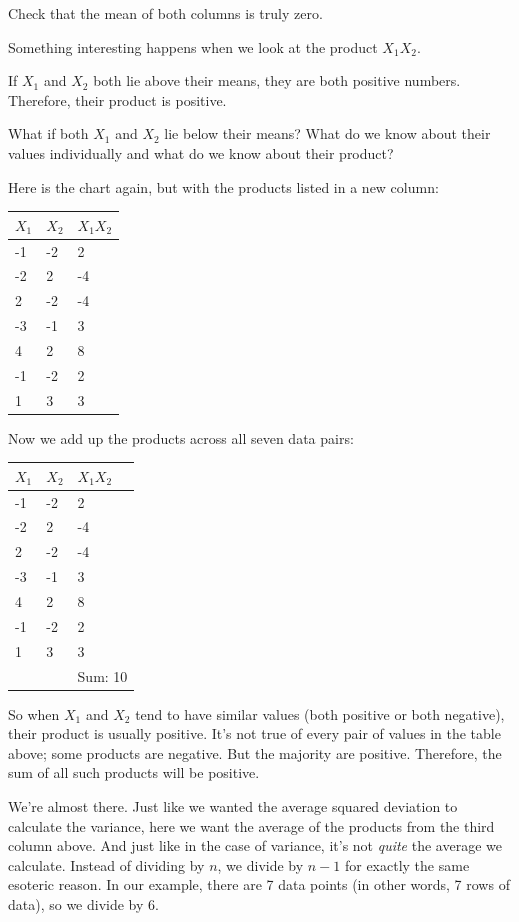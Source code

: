 \documentclass[
]{book}
\begin{document}
Check that the mean of both columns is truly zero.

Something interesting happens when we look at the product \(X_{1}X_{2}\).

If \(X_{1}\) and \(X_{2}\) both lie above their means, they are both positive numbers. Therefore, their product is positive.

What if both \(X_{1}\) and \(X_{2}\) lie below their means? What do we know about their values individually and what do we know about their product?

Here is the chart again, but with the products listed in a new column:

\begin{longtable}[]{@{}lll@{}}
\toprule
\(X_{1}\) & \(X_{2}\) & \(X_{1}X_{2}\) \\
\midrule
\endhead
-1 & -2 & 2 \\
-2 & 2 & -4 \\
2 & -2 & -4 \\
-3 & -1 & 3 \\
4 & 2 & 8 \\
-1 & -2 & 2 \\
1 & 3 & 3 \\
\bottomrule
\end{longtable}

Now we add up the products across all seven data pairs:

\begin{longtable}[]{@{}lll@{}}
\toprule
\(X_{1}\) & \(X_{2}\) & \(X_{1}X_{2}\) \\
\midrule
\endhead
-1 & -2 & 2 \\
-2 & 2 & -4 \\
2 & -2 & -4 \\
-3 & -1 & 3 \\
4 & 2 & 8 \\
-1 & -2 & 2 \\
1 & 3 & 3 \\
& & Sum: 10 \\
\bottomrule
\end{longtable}

So when \(X_{1}\) and \(X_{2}\) tend to have similar values (both positive or both negative), their product is usually positive. It's not true of every pair of values in the table above; some products are negative. But the majority are positive. Therefore, the sum of all such products will be positive.

We're almost there. Just like we wanted the average squared deviation to calculate the variance, here we want the average of the products from the third column above. And just like in the case of variance, it's not \emph{quite} the average we calculate. Instead of dividing by \(n\), we divide by \(n - 1\) for exactly the same esoteric reason. In our example, there are 7 data points (in other words, 7 rows of data), so we divide by 6.
\end{document}
